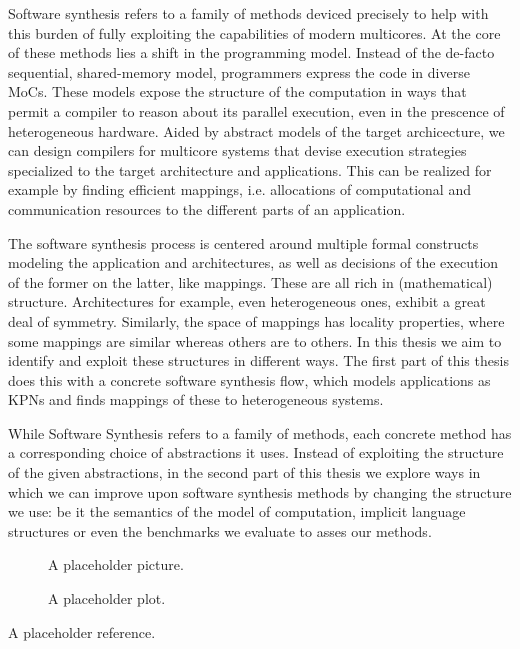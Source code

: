 Software synthesis refers to a family of methods deviced precisely to help with this burden of fully exploiting the capabilities of modern multicores. At the core of these methods lies a shift in the programming model. Instead of the de-facto sequential, shared-memory model, programmers express the code in diverse \acp{MoC}. These models expose the structure of the computation in ways that permit a compiler to reason about its parallel execution, even in the prescence of heterogeneous hardware. Aided by abstract models of the target archicecture, we can design compilers for multicore systems that devise execution strategies specialized to the target architecture and applications. This can be realized for example by finding efficient mappings, i.e. allocations of computational and communication resources to the different parts of an application.

The software synthesis process is centered around multiple formal constructs modeling the application and architectures, as well as decisions of the execution of the former on the latter, like mappings.
These are all rich in (mathematical) structure. Architectures for example, even heterogeneous ones, exhibit a great deal of symmetry. Similarly, the space of mappings has locality properties, where some mappings are similar whereas others are to others. In this thesis we aim to identify and exploit these structures in different ways. The first part of this thesis does this with a concrete software synthesis flow, which models applications as \acp{KPN} and finds mappings of these to heterogeneous systems.

While Software Synthesis refers to a family of methods, each concrete method has a corresponding choice of abstractions it uses. Instead of exploiting the structure of the given abstractions, in the second part of this thesis we explore ways in which we can improve upon software synthesis methods by changing the structure we use: be it the semantics of the model of computation, implicit language structures or even the benchmarks we evaluate to asses our methods.

\begin{figure}[h]
	\centering
   \resizebox{0.55\textwidth}{!}{}
	\caption{A placeholder picture.}
	\label{fig:placeholder}
\end{figure}

\begin{figure}[h]
	\centering
   \resizebox{0.55\textwidth}{!}{}
	\caption{A placeholder plot.}
	\label{fig:placeholder}
\end{figure}

A placeholder reference\cite{goens_multiprog18}.
